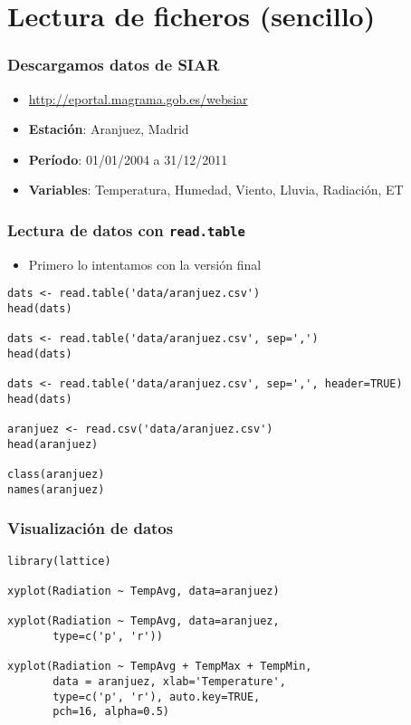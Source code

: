 \documentclass{beamer}
\begin{document}
\section{Lectura de ficheros (sencillo)}
\label{sec-2}
\begin{frame}
\frametitle{Descargamos datos de SIAR}
\label{sec-2-1}

\begin{itemize}
\item \href{http://eportal.magrama.gob.es/websiar}{http://eportal.magrama.gob.es/websiar}
\item \textbf{Estación}: Aranjuez, Madrid
\item \textbf{Período}: 01/01/2004 a 31/12/2011
\item \textbf{Variables}: Temperatura, Humedad, Viento, Lluvia, Radiación, ET
\end{itemize}
\end{frame}
\begin{frame}[fragile]
\frametitle{Lectura de datos con \texttt{read.table}}
\label{sec-2-2}

\begin{itemize}
\item Primero lo intentamos con la versión final
\end{itemize}

\lstset{language=R}
\begin{lstlisting}
dats <- read.table('data/aranjuez.csv')
head(dats)

dats <- read.table('data/aranjuez.csv', sep=',')
head(dats)

dats <- read.table('data/aranjuez.csv', sep=',', header=TRUE)
head(dats)

aranjuez <- read.csv('data/aranjuez.csv')
head(aranjuez)

class(aranjuez)
names(aranjuez)
\end{lstlisting}
\end{frame}
\begin{frame}[fragile]
\frametitle{Visualización de datos}
\label{sec-2-3}


\lstset{language=R}
\begin{lstlisting}
library(lattice)

xyplot(Radiation ~ TempAvg, data=aranjuez)

xyplot(Radiation ~ TempAvg, data=aranjuez,
       type=c('p', 'r'))

xyplot(Radiation ~ TempAvg + TempMax + TempMin,
       data = aranjuez, xlab='Temperature',
       type=c('p', 'r'), auto.key=TRUE,
       pch=16, alpha=0.5)
\end{lstlisting}
  
\end{frame}
\end{document}
